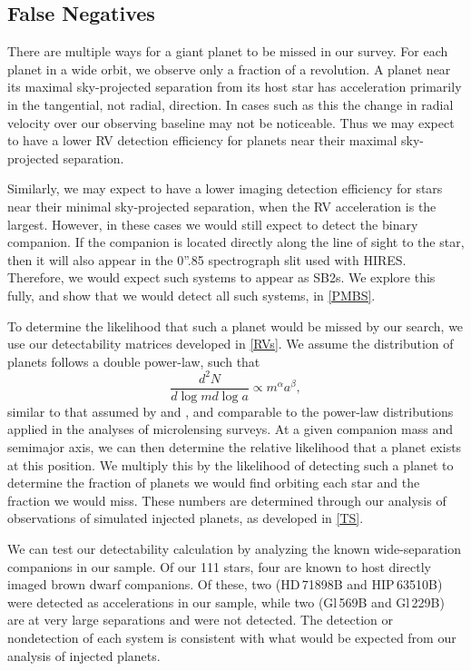 \subsection{False Negatives}
\label{FN}

There are multiple ways for a giant planet to be missed in our survey. For each planet in a wide orbit, we observe only a fraction of a revolution. A planet near its maximal sky-projected separation from its host star has acceleration primarily in the tangential, not radial, direction. In cases such as this the change in radial velocity over our observing baseline may not be noticeable. Thus we may expect to have a lower RV detection efficiency for planets near their maximal sky-projected separation. 

Similarly, we may expect to have a lower imaging detection efficiency for stars near their minimal sky-projected separation, when the RV acceleration is the largest. However, in these cases we would still expect to detect the binary companion. If the companion is located directly along the line of sight to the star, then it will also appear in the 0''.85 spectrograph slit used with HIRES. Therefore, we would expect such systems to appear as SB2s. We explore this fully, and show that we would detect all such systems, in \textsection\ref{PMBS}.

To determine the likelihood that such a planet would be missed by our search, we use our detectability matrices developed in \textsection\ref{RVs}. We assume the distribution of planets follows a double power-law, such that
\begin{equation}
\frac{d^2N}{d\log m d\log a} \propto m^{\alpha} a^{\beta},
\label{DPL}
\end{equation}
similar to that assumed by \citet{Cumming08} and \citet{Bowler10}, and comparable to the power-law distributions applied in the analyses of microlensing surveys. At a given companion mass and semimajor axis, we can then determine the relative likelihood that a planet exists at this position. We multiply this by the likelihood of detecting such a planet to determine the fraction of planets we would find orbiting each star and the fraction we would miss. These numbers are determined through our analysis of observations of simulated injected planets, as developed in \textsection \ref{TS}.

We can test our detectability calculation by analyzing the known wide-separation companions in our sample. Of our 111 stars, four are known to host directly imaged brown dwarf companions. Of these, two (HD\,71898B and HIP\,63510B) were detected as accelerations in our sample, while two (Gl\,569B and Gl\,229B) are at very large separations and were not detected. The detection or nondetection of each system is consistent with what would be expected from our analysis of injected planets.



